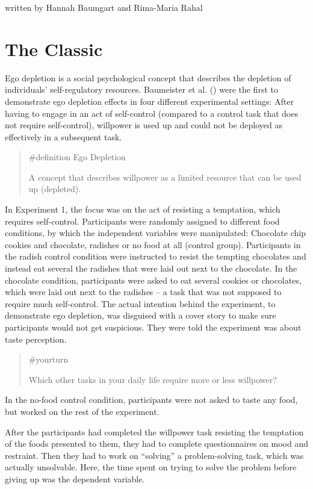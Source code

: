 \documentclass[
  letterpaper,
]{book}
\begin{document}
{written by Hannah Baumgart and Rima-Maria Rahal}

\section{The Classic}\label{the-classic}

Ego depletion is a social psychological concept that describes the
depletion of individuals' self-regulatory resources. Baumeister et al.
() were the first to demonstrate ego
depletion effects in four different experimental settings: After having
to engage in an act of self-control (compared to a control task that
does not require self-control), willpower is used up and could not be
deployed as effectively in a subsequent task.

\begin{quote}
\label{def-egodepletion}{\#definition} Ego Depletion

A concept that describes willpower as a limited resource that can be
used up (depleted).
\end{quote}

In Experiment 1, the focus was on the act of resisting a temptation,
which requires self-control. Participants were randomly assigned to
different food conditions, by which the independent variables were
manipulated: Chocolate chip cookies and chocolate, radishes or no food
at all (control group). Participants in the radish control condition
were instructed to resist the tempting chocolates and instead eat
several the radishes that were laid out next to the chocolate. In the
chocolate condition, participants were asked to eat several cookies or
chocolates, which were laid out next to the radishes -- a task that was
not supposed to require much self-control. The actual intention behind
the experiment, to demonstrate ego depletion, was disguised with a cover
story to make sure participants would not get suspicious. They were told
the experiment was about taste perception.

\begin{quote}
{\#yourturn}

Which other tasks in your daily life require more or less willpower?
\end{quote}

In the no-food control condition, participants were not asked to taste
any food, but worked on the rest of the experiment.

After the participants had completed the willpower task resisting the
temptation of the foods presented to them, they had to complete
questionnaires on mood and restraint. Then they had to work on
``solving'' a problem-solving task, which was actually unsolvable. Here,
the time spent on trying to solve the problem before giving up was the
dependent variable.
\end{document}
